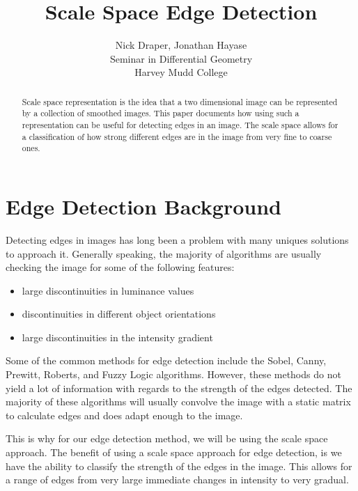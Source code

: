 \documentclass{article}
\title{Scale Space Edge Detection}
\author{
  Nick Draper, Jonathan Hayase\\
  Seminar in Differential Geometry\\
  Harvey Mudd College
}
\begin{document}
\maketitle

\begin{abstract}
  Scale space representation is the idea that a two dimensional image can be represented by a collection of smoothed images.
  This paper documents how using such a representation can be useful for detecting edges in an image.
  The scale space allows for a classification of how strong different edges are in the image from very fine to coarse ones. 
\end{abstract}

\section{Edge Detection Background}
Detecting edges in images has long been a problem with many uniques solutions to approach it.
Generally speaking, the majority of algorithms are usually checking the image for some of the following features:

\begin{itemize}
\item large discontinuities in luminance values
\item discontinuities in different object orientations
\item large discontinuities in the intensity gradient
\end{itemize}
\indent Some of the common methods for edge detection include the Sobel, Canny, Prewitt, Roberts, and Fuzzy Logic algorithms.
However, these methods do not yield a lot of information with regards to the strength of the edges detected.
The majority of these algorithms will usually convolve the image with a static matrix to calculate edges and does adapt enough to the image. 

This is why for our edge detection method, we will be using the scale space approach.
The benefit of using a scale space approach for edge detection, is we have the ability to classify the strength of the edges in the image.
This allows for a range of edges from very large immediate changes in intensity to very gradual.
\end{document}
